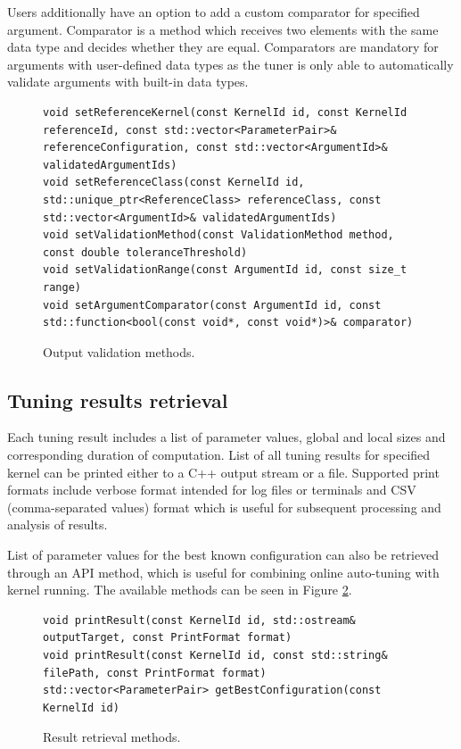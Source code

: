 \documentclass
[
    digital, %
    oneside, %
    table, %
    nolof, %
    nolot, %
    nocover %
]{fithesis3}
\begin{document}
Users additionally have an option to add a custom comparator for specified argument. Comparator is a method which receives two elements with the same
data type and decides whether they are equal. Comparators are mandatory for arguments with user-defined data types as the tuner is only able to
automatically validate arguments with built-in data types.

\begin{figure}
\begin{adjustwidth}{-1cm}{-1cm}
\begin{lstlisting}
void setReferenceKernel(const KernelId id, const KernelId referenceId, const std::vector<ParameterPair>& referenceConfiguration, const std::vector<ArgumentId>& validatedArgumentIds)
void setReferenceClass(const KernelId id, std::unique_ptr<ReferenceClass> referenceClass, const std::vector<ArgumentId>& validatedArgumentIds)
void setValidationMethod(const ValidationMethod method, const double toleranceThreshold)
void setValidationRange(const ArgumentId id, const size_t range)
void setArgumentComparator(const ArgumentId id, const std::function<bool(const void*, const void*)>& comparator)
\end{lstlisting}
\caption{Output validation methods.}
\label{ktt-validation-methods}
\end{adjustwidth}
\end{figure}

\subsection{Tuning results retrieval}
Each tuning result includes a list of parameter values, global and local sizes and corresponding duration of computation. List of all tuning
results for specified kernel can be printed either to a C++ output stream or a file. Supported print formats include verbose format intended for log
files or terminals and CSV (comma-separated values) format which is useful for subsequent processing and analysis of results.

List of parameter values for the best known configuration can also be retrieved through an API method, which is useful for combining online
auto-tuning with kernel running. The available methods can be seen in Figure \ref{ktt-result-methods}.

\begin{figure}
\begin{adjustwidth}{-1cm}{-1cm}
\begin{lstlisting}
void printResult(const KernelId id, std::ostream& outputTarget, const PrintFormat format)
void printResult(const KernelId id, const std::string& filePath, const PrintFormat format)
std::vector<ParameterPair> getBestConfiguration(const KernelId id)
\end{lstlisting}
\caption{Result retrieval methods.}
\label{ktt-result-methods}
\end{adjustwidth}
\end{figure}
\end{document}
